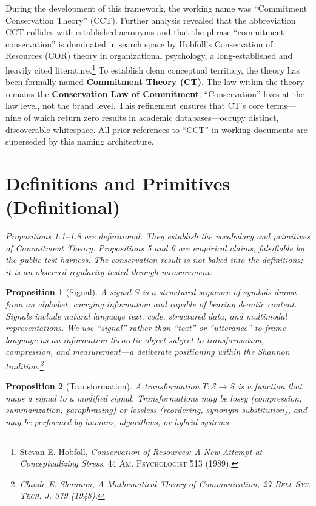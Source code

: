 \documentclass[11pt,a4paper]{article}
\newtheorem{proposition}{Proposition}[section]
\begin{document}
During the development of this framework, the working name was ``Commitment Conservation Theory'' (CCT). Further analysis revealed that the abbreviation CCT collides with established acronyms and that the phrase ``commitment conservation'' is dominated in search space by Hobfoll's Conservation of Resources (COR) theory in organizational psychology, a long-established and heavily cited literature.\footnote{Stevan E. Hobfoll, \textit{Conservation of Resources: A New Attempt at Conceptualizing Stress}, 44 \textsc{Am. Psychologist} 513 (1989).} To establish clean conceptual territory, the theory has been formally named \textbf{Commitment Theory (CT)}. The law within the theory remains the \textbf{Conservation Law of Commitment}. ``Conservation'' lives at the law level, not the brand level. This refinement ensures that CT's core terms---nine of which return zero results in academic databases---occupy distinct, discoverable whitespace. All prior references to ``CCT'' in working documents are superseded by this naming architecture.

\section{Definitions and Primitives (Definitional)}

\textit{Propositions 1.1--1.8 are definitional. They establish the vocabulary and primitives of Commitment Theory. Propositions 5 and 6 are empirical claims, falsifiable by the public test harness. The conservation result is not baked into the definitions; it is an observed regularity tested through measurement.}

\begin{proposition}[Signal]
A \emph{signal} $S$ is a structured sequence of symbols drawn from an alphabet, carrying information and capable of bearing deontic content. Signals include natural language text, code, structured data, and multimodal representations. We use ``signal'' rather than ``text'' or ``utterance'' to frame language as an information-theoretic object subject to transformation, compression, and measurement---a deliberate positioning within the Shannon tradition.\footnote{Claude E. Shannon, \textit{A Mathematical Theory of Communication}, 27 \textsc{Bell Sys. Tech. J.} 379 (1948).}
\end{proposition}

\begin{proposition}[Transformation]
A \emph{transformation} $T: \mathcal{S} \to \mathcal{S}$ is a function that maps a signal to a modified signal. Transformations may be lossy (compression, summarization, paraphrasing) or lossless (reordering, synonym substitution), and may be performed by humans, algorithms, or hybrid systems.
\end{proposition}
\end{document}
